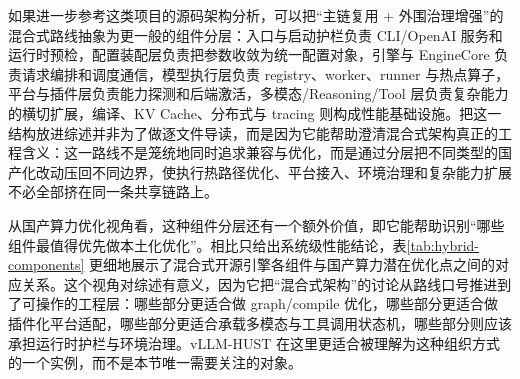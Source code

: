 如果进一步参考这类项目的源码架构分析，可以把“主链复用 + 外围治理增强”的混合式路线抽象为更一般的组件分层：入口与启动护栏负责 CLI/OpenAI 服务和运行时预检，配置装配层负责把参数收敛为统一配置对象，引擎与 EngineCore 负责请求编排和调度通信，模型执行层负责 registry、worker、runner 与热点算子，平台与插件层负责能力探测和后端激活，多模态/Reasoning/Tool 层负责复杂能力的横切扩展，编译、KV Cache、分布式与 tracing 则构成性能基础设施\citep{vllmhust}。把这一结构放进综述并非为了做逐文件导读，而是因为它能帮助澄清混合式架构真正的工程含义：这一路线不是笼统地同时追求兼容与优化，而是通过分层把不同类型的国产化改动压回不同边界，使执行热路径优化、平台接入、环境治理和复杂能力扩展不必全部挤在同一条共享链路上。

从国产算力优化视角看，这种组件分层还有一个额外价值，即它能帮助识别“哪些组件最值得优先做本土化优化”。相比只给出系统级性能结论，表\ref{tab:hybrid-components} 更细地展示了混合式开源引擎各组件与国产算力潜在优化点之间的对应关系。这个视角对综述有意义，因为它把“混合式架构”的讨论从路线口号推进到了可操作的工程层：哪些部分更适合做 graph/compile 优化，哪些部分更适合做插件化平台适配，哪些部分更适合承载多模态与工具调用状态机，哪些部分则应该承担运行时护栏与环境治理。vLLM-HUST 在这里更适合被理解为这种组织方式的一个实例，而不是本节唯一需要关注的对象。

